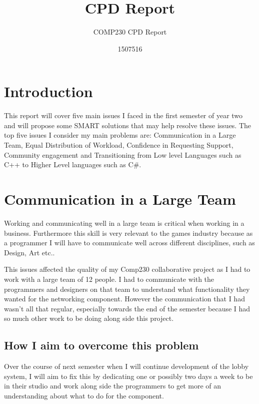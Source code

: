 \documentclass{scrartcl}
\title{CPD Report}
\subtitle{COMP230 CPD Report}
\author{1507516}
\begin{document}
\maketitle





\section{Introduction}
This report will cover five main issues I faced in the first semester of year two and will propose some SMART solutions that may help resolve these issues.
The top five issues I consider my main problems are: Communication in a Large Team, Equal Distribution of Workload, Confidence in Requesting Support, Community engagement and Transitioning from Low level Languages such as C++ to Higher Level languages such as C\#.

\section{Communication in a Large Team}

Working and communicating well in a large team is critical when working in a business. Furthermore this skill is very relevant to the games industry because as a programmer I will have to communicate well across different disciplines, such as Design, Art etc..


This issues affected the quality of my Comp230 collaborative project as I had to work with a large team of 12 people. I had to communicate with the programmers and designers on that team to understand what functionality they wanted for the networking component. However the communication that I had wasn't all that regular, especially towards the end of the semester because I had so much other work to be doing along side this project.


\subsection{How I aim to overcome this problem}
Over the course of next semester when I will continue development of the lobby system, I will aim to fix this by dedicating one or possibly two days a week to be in their studio and work along side the programmers to get more of an understanding about what to do for the component.
\end{document}

